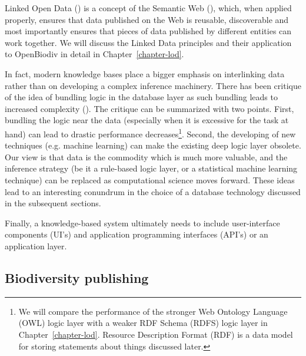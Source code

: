 Linked Open Data (\cite{heath_linked_2011}) is a concept of the Semantic Web (\cite{berners-lee_semantic_2001}), which, when applied properly, ensures that data published on the Web is reusable, discoverable and most importantly ensures that pieces of data published by different entities can work together.  We will discuss the Linked Data principles and their application to OpenBiodiv in detail in Chapter~\ref{chapter-lod}.

In fact, modern knowledge bases place a bigger emphasis on interlinking data rather than on developing a complex inference machinery. There has been critique of the idea of bundling logic in the database layer as such bundling leads to increased complexity (\cite{barrasa_rdf_2017}). The critique can be summarized with two points. First, bundling the logic near the data (especially when it is excessive for the task at hand) can lead to drastic performance decreases\footnote{ We will compare the performance of the stronger Web Ontology Language (OWL) logic layer with a weaker RDF Schema (RDFS) logic layer in Chapter~\ref{chapter-lod}. Resource Description Format (RDF) is a data model for storing statements about things discussed later.}. Second, the developing of new techniques (e.g. machine learning) can make the existing deep logic layer obsolete. Our view is that data is the commodity which is much more valuable, and the inference strategy (be it a rule-based logic layer, or a statistical machine learning technique) can be replaced as computational science moves forward. These ideas lead to an interesting conundrum in the choice of a database technology discussed in the subsequent sections.

Finally, a knowledge-based system ultimately needs to include user-interface components (UI's) and application programming interfaces (API's) or an application layer.

\subsection*{Biodiversity publishing}

